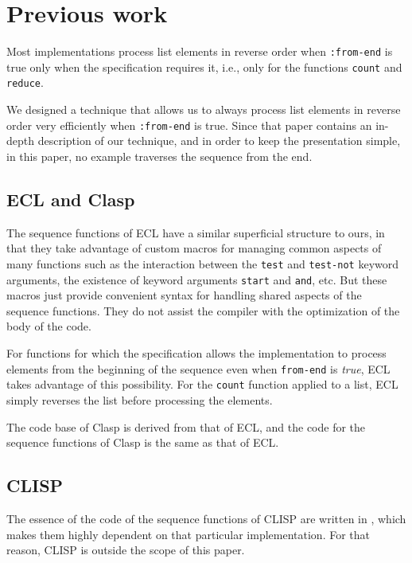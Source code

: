 \section{Previous work}

Most implementations process list elements in reverse order when
\texttt{:from-end} is true only when the specification requires it,
i.e., only for the functions \texttt{count} and \texttt{reduce}.

We designed a technique \cite{Durand:2015:ELS:reverse} that allows us
to always process list elements in reverse order very efficiently when
\texttt{:from-end} is true.  Since that paper contains an in-depth
description of our technique, and in order to keep the presentation
simple, in this paper, no example traverses the sequence from the
end.

\subsection{ECL and Clasp}

The sequence functions of ECL have a similar superficial structure to
ours, in that they take advantage of custom macros for managing common
aspects of many functions such as the interaction between the
\texttt{test} and \texttt{test-not} keyword arguments, the existence
of keyword arguments \texttt{start} and \texttt{and}, etc.
But these macros just provide convenient syntax for handling shared
aspects of the sequence functions.  They do not assist the compiler
with the optimization of the body of the code.

For functions for which the \commonlisp{} specification allows the
implementation to process elements from the beginning of the sequence
even when \texttt{from-end} is \emph{true}, ECL takes advantage of
this possibility.  For the \texttt{count} function applied to a list,
ECL simply reverses the list before processing the elements.

The \commonlisp{} code base of Clasp is derived from that of ECL, and
the code for the sequence functions of Clasp is the same as that of
ECL.

\subsection{CLISP}

The essence of the code of the sequence functions of CLISP are written
in \clanguage{}, which makes them highly dependent on that particular
implementation.  For that reason, CLISP is outside the scope of this
paper.

